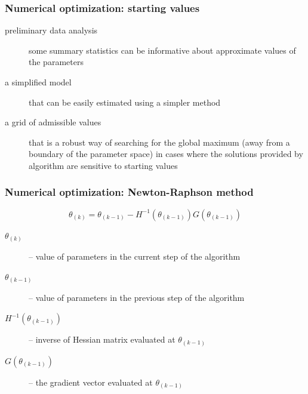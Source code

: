 \documentclass[notes,blackandwhite,mathsans]{beamer}
\begin{document}
\begin{frame}
\frametitle{Numerical optimization: starting values}


\begin{description}
\item[preliminary data analysis] {\color{mcxs2}some summary statistics can be informative about approximate values of the parameters}
\item[a simplified model] {\color{mcxs2}that can be easily estimated using a simpler method}
\item[a grid of admissible values] {\color{mcxs2}that is a robust way of searching for the global maximum (away from a boundary of the parameter space) in cases where the solutions provided by algorithm are sensitive to starting values}
\end{description}


\end{frame}






\begin{frame}
\frametitle{Numerical optimization: Newton-Raphson method}

\vspace{1cm}
$$ \theta_{(k)} = \theta_{(k-1)} - H^{-1}\left(\theta_{(k-1)}\right)G\left(\theta_{(k-1)}\right) $$

\bigskip\begin{description}
\item[$\theta_{(k)}$] {\color{mcxs2}-- value of parameters in the current step of the algorithm}
\item[$\theta_{(k-1)}$] {\color{mcxs2}-- value of parameters in the previous step of the algorithm}
\item[$H^{-1}\left(\theta_{(k-1)}\right)$] {\color{mcxs2}-- inverse of Hessian matrix evaluated at} $\theta_{(k-1)}$
\item[$G\left(\theta_{(k-1)}\right)$] {\color{mcxs2}-- the gradient vector evaluated at} $\theta_{(k-1)}$
\end{description}

\end{frame}
\end{document}
